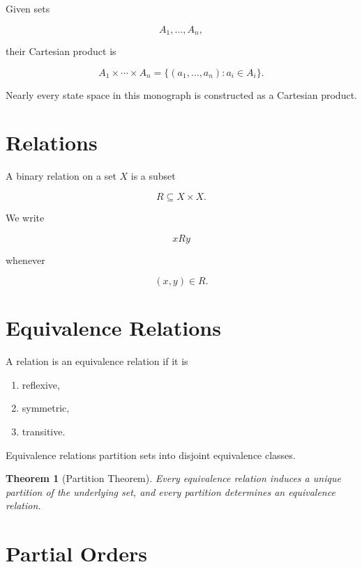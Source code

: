 \documentclass[11pt,fleqn]{book}
\numberwithin{equation}{chapter}
\theoremstyle{plain}
\newtheorem{theorem}{Theorem}[chapter]
\theoremstyle{definition}
\theoremstyle{remark}
\begin{document}
Given sets

\[
A_1,\ldots,A_n,
\]

their Cartesian product is

\[
A_1\times\cdots\times A_n
=
\{
(a_1,\ldots,a_n)
:
a_i\in A_i
\}.
\]

Nearly every state space in this monograph is constructed as a Cartesian
product.


\section{Relations}

A binary relation on a set $X$ is a subset

\[
R
\subseteq
X\times X.
\]

We write

\[
xRy
\]

whenever

\[
(x,y)\in R.
\]


\section{Equivalence Relations}

A relation is an equivalence relation if it is

\begin{enumerate}
\item reflexive,
\item symmetric,
\item transitive.
\end{enumerate}

Equivalence relations partition sets into disjoint equivalence classes.


\begin{theorem}[Partition Theorem]

Every equivalence relation induces a unique partition of the underlying
set, and every partition determines an equivalence relation.

\end{theorem}


\section{Partial Orders}
\end{document}
